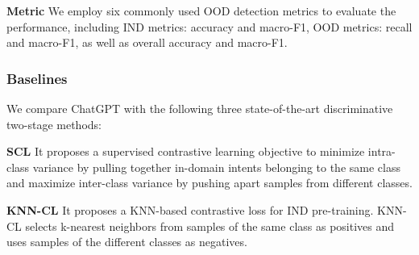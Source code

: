 \documentclass[10pt, a4paper]{article}
\begin{document}
\textbf{Metric} We employ six commonly used OOD detection metrics to evaluate the performance, including IND metrics: accuracy and macro-F1, OOD metrics: recall and macro-F1, as well as overall accuracy and macro-F1.


\begin{table}
\vspace{0cm}
\caption{Statistics of datasets.}
\label{dataset}
\end{table}

\subsubsection{Baselines}
We compare ChatGPT with the following three state-of-the-art discriminative two-stage methods:

\textbf{SCL} \cite{zeng-etal-2021-modeling} It proposes a supervised contrastive learning objective to minimize intra-class variance by pulling together in-domain intents belonging to the same class and maximize inter-class variance by pushing apart samples from different classes.

\textbf{KNN-CL} \cite{zhou-etal-2022-knn} It proposes a KNN-based contrastive loss for IND pre-training. KNN-CL selects k-nearest neighbors from samples of the same class as positives and uses samples of the different classes as negatives. 
\end{document}
